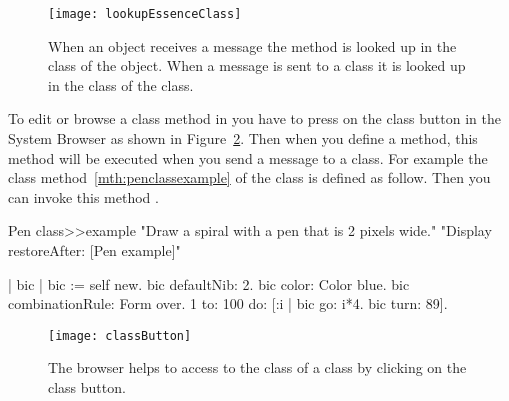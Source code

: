 \begin{figure}
\centerline{\texttt{[image: lookupEssenceClass]}} 
\caption{When an object receives a message the method is looked up in the class of the object. When a message is sent to a class it is looked up in the class of the class.\label{fig:lookupEssenceClass}}
\end{figure}

To edit or browse a class method in \sq you have to press on the class button in the System Browser as shown in Figure~\ref{fig:classButton}. 
Then when you define a method, this method will be executed when you 
send a message to a class. For example the class method~\ref{mth:penclassexample}  of the class  is defined as follow. Then you can invoke this method .


\begin{method}\label{mth:penclassexample}
Pen class>>example
   "Draw a spiral with a pen that is 2 pixels wide."
   "Display restoreAfter: [Pen example]"

   | bic |
   bic := self new.
   bic defaultNib: 2.
   bic color: Color blue.
   bic combinationRule: Form over.
   1 to: 100 do: [:i | bic go: i*4. bic turn: 89].
\end{method}



\begin{figure}
\centerline{\texttt{[image: classButton]}} 
\caption{The browser helps to access to the class of a class by clicking on the class button. \label{fig:classButton}}
\end{figure}




\summa

